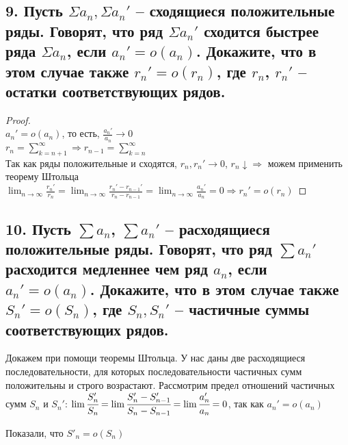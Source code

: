 \documentclass[a4paper, fleqn]{article}
\begin{document}
    \subsection*{9. Пусть $ \Sigma a_n, \Sigma a_n'$ -- сходящиеся положительные
    ряды. Говорят, что ряд $  \Sigma a_n'$ сходится быстрее ряда 
    $ \Sigma a_n$, если $  a_n' = o(a_n)$. 
    Докажите, что в этом случае также $  r_n' = o(r_n)$, где
    $ r_n$, $  r_n'$ -- остатки соответствующих рядов.}
    \begin{proof} \ \\ 
        $\displaystyle a_n' = o(a_n)$, то есть, $\displaystyle \frac{a_n'}{a_n} \to 0$ \\
        $\displaystyle r_n = \sum_{k = n + 1}^{\infty} \Rightarrow r_{n - 1} = \sum_{k = n}^{\infty}$ \\ 
        Так как ряды положительные и сходятся,
         $\displaystyle r_n, r_n' \to 0$, $\displaystyle r_n \downarrow \Rightarrow$ можем применить
         теорему Штольца \\ 
         $\displaystyle \lim_{n \to \infty}{\frac{r_n'}{r_n}} = 
         \lim_{n \to \infty}{\frac{r_n' - r_{n - 1}'}{r_n - r_{n - 1}}} = 
         \lim_{n \to \infty}{\frac{a_n'}{a_n}} = 0 \Rightarrow r_n' = o(r_n)$
    \end{proof}
        
        \subsection*{10. Пусть $\sum a_n$, $\sum a_n'$ -- расходящиеся положительные ряды. Говорят, что ряд $\sum a_n'$ расходится медленнее чем ряд $a_n$, если $a_n'=o(a_n)$. Докажите, что в этом случае также $S_n'=o(S_n)$, где $S_n,  S_n'$ -- частичные суммы соответствующих рядов.}
        Докажем при помощи теоремы Штольца. У нас даны две расходящиеся последовательности, для которых последовательности частичных сумм положительны и строго возрастают. Рассмотрим предел отношений частичных сумм $S_n$ и $S_n'$:
        $\lim \cfrac{S_n'}{S_n}=\lim \cfrac{S_n'-S'_{n-1}}{S_n-S_{n-1}}=\lim \cfrac{a_n'}{a_n}=
        0$, так как $a_n'=o(a_n)$
        
        Показали, что $S'_n=o(S_n)$
\end{document}

